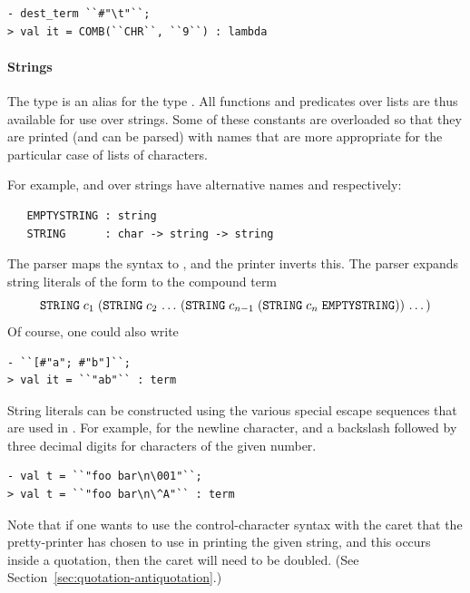 {\begin{session}
\begin{verbatim}
- dest_term ``#"\t"``;
> val it = COMB(``CHR``, ``9``) : lambda
\end{verbatim}
\end{session}



\paragraph {Strings}

The type  is an alias for the type .
All functions and predicates over lists are thus available for use
over strings.  Some of these constants are overloaded so that they are
printed (and can be parsed) with names that are more appropriate for
the particular case of lists of characters.

For example,  and  over strings have
alternative names  and 
respectively:
%
\begin{hol}
\begin{verbatim}
   EMPTYSTRING : string
   STRING      : char -> string -> string
\end{verbatim}
\end{hol}
The \HOL{} parser maps the syntax  to ,
and the \HOL{} printer inverts this.  The parser expands string
literals of the form  to the compound
term
\[
\holtxt{STRING} \;c_1\; (\holtxt{STRING}\;c_2\,\ldots\,
 (\holtxt{STRING} \;c_{n-1} \; (\holtxt{STRING}\;
c_n \; \holtxt{EMPTYSTRING})) \,\ldots\, )
\]
Of course, one could also write
\begin{session}
\begin{verbatim}
- ``[#"a"; #"b"]``;
> val it = ``"ab"`` : term
\end{verbatim}
\end{session}

String literals can be constructed using the various special escape
sequences that are used in \ML{}.  For example,  for the
newline character, and a backslash followed by three decimal digits
for characters of the given number.
\begin{session}
\begin{verbatim}
- val t = ``"foo bar\n\001"``;
> val t = ``"foo bar\n\^A"`` : term
\end{verbatim}
\end{session}
Note that if one wants to use the control-character syntax with the
caret that the pretty-printer has chosen to use in printing the given
string, and this occurs inside a quotation, then the caret will need
to be doubled.  (See Section~\ref{sec:quotation-antiquotation}.)

}
